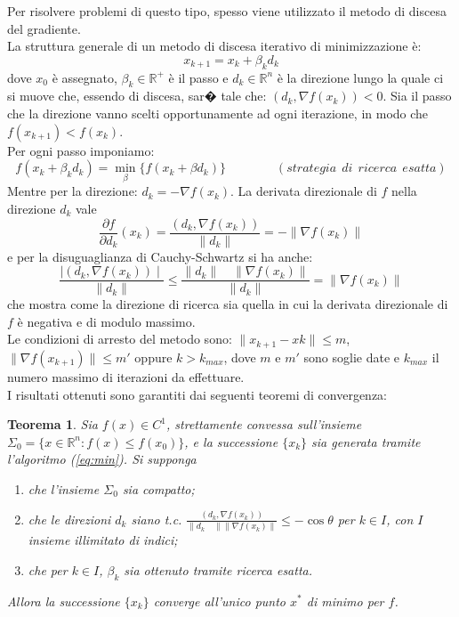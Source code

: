 \documentclass[a4paper,12pt,oneside]{book}
\begin{document}
Per risolvere problemi di questo tipo, spesso viene utilizzato il metodo di discesa del gradiente.\cite{an} \\
La struttura generale di un metodo di discesa iterativo di minimizzazione \`e:
\begin{equation}\label{eq:min}
x_{k+1}=x_{k}+\beta_{k}d_{k}
\end{equation}
dove $x_{0}$ \`e assegnato, $\beta_{k}\in \mathbb{R^{+}}$ \`e il passo e $d_{k}\in \mathbb{R}^{n}$ \`e la direzione lungo la quale ci si muove che, essendo di discesa, sar� tale che: $(d_{k},\nabla f(x_{k}))<0$. Sia il passo che la direzione vanno scelti opportunamente ad ogni iterazione, in modo che $f(x_{k+1})<f(x_{k})$.\\
Per ogni passo imponiamo:
$$f(x_{k}+\beta_{k}d_{k})=\min_{\beta}\{f(x_{k}+\beta d_{k})\}\qquad \qquad (strategia\: \: di\: \: ricerca\: \: esatta)$$
Mentre per la direzione: $d_{k}=-\nabla f(x_{k})$. La derivata direzionale di $f$ nella direzione $d_{k}$ vale $$\frac{\partial f}{\partial d_{k}}(x_{k})=\frac{(d_{k},\nabla f(x_{k}))}{\parallel d_{k}\parallel}=-\parallel \nabla f(x_{k})\parallel$$ e per la disuguaglianza di Cauchy-Schwartz si ha anche: $$\frac{\mid (d_{k},\nabla f(x_{k}))\mid}{\parallel d_{k}\parallel}\leq \frac{\parallel d_{k} \parallel \quad \parallel \nabla f(x_{k})\parallel}{\parallel d_{k}\parallel}=\parallel \nabla f(x_{k})\parallel$$ che mostra come la direzione di ricerca sia quella in cui la derivata direzionale di $f$ \`e negativa e di modulo massimo.\\
Le condizioni di arresto del metodo sono: $\parallel x_{k+1}-x{k}\parallel \leq m$, $\parallel \nabla f(x_{k+1})\parallel \leq m\prime$ oppure $k>k_{max}$, dove $m$ e $m\prime$ sono soglie date e $k_{max}$ il numero massimo di iterazioni da effettuare.\\
I risultati ottenuti sono garantiti dai seguenti teoremi di convergenza:
\newtheorem{teo}{Teorema}
\begin{teo}
Sia $f(x)\in C^{1}$, strettamente convessa sull'insieme $\Sigma_{0}=\{x\in\mathbb{R}^{n}:f(x)\leq f(x_{0})\}$, e la successione $\{x_{k}\}$ sia generata tramite l'algoritmo (\ref{eq:min}). Si supponga
\begin{enumerate}
\item che l'insieme $\Sigma_{0}$ sia compatto;
\item che le direzioni $d_{k}$ siano t.c. $\frac{(d_{k},\nabla f(x_{k}))}{\parallel d_{k}\quad \parallel \parallel \nabla f(x_{k})\parallel}\leq - \cos \theta$ per $k\in \textit{I}$, con $\textit{I}$ insieme illimitato di indici;
\item che per $k\in \textit{I}$, $\beta_{k}$ sia ottenuto tramite ricerca esatta.
\end{enumerate}
Allora la successione $\{x_{k}\}$ converge all'unico punto $x^{*}$ di minimo per $f$.
\end{teo}
\end{document}
